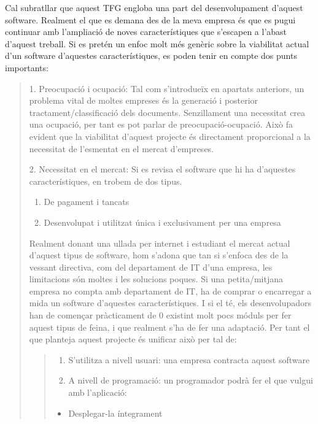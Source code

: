 \documentclass[letterpaper,11pt,catalan]{sphinxmanual}
\begin{document}
Cal subratllar que aquest TFG engloba una part del desenvolupament d'aquest software. Realment
el que es demana des de la meva empresa és que es pugui continuar amb l'ampliació de noves
característiques que s'escapen a l'abast d'aquest treball. Si es pretén un enfoc molt més
genèric sobre la viabilitat actual d'un software d'aquestes característiques, es poden
tenir en compte dos punts importants:
\begin{quote}

1. Preocupació i ocupació:
Tal com s'introdueïx en apartats anteriors, un problema vital de moltes empreses
és la generació i posterior tractament/classificació dels documents. Senzillament
una necessitat crea una ocupació, per tant es pot parlar de preocupació-ocupació.
Això fa evident que la viabilitat d'aquest projecte és directament proporcional
a la necessitat de l'esmentat en el mercat d'empreses.

2. Necessitat en el mercat:
Si es revisa el software que hi ha d'aquestes característiques, en trobem de dos tipus.
\begin{enumerate}
\item {} 
De pagament i tancats

\item {} 
Desenvolupat i utilitzat única i exclusivament per una empresa

\end{enumerate}

Realment donant una ullada per internet i estudiant el mercat actual d'aquest tipus de
software, hom s'adona que tan si s'enfoca des de la vessant directiva, com
del departament de IT d'una empresa, les limitacions són moltes i les solucions poques.
Si una petita/mitjana empresa no compta amb departament de IT, ha de comprar o encarregar
a mida un software d'aquestes característiques. I si el té, els desenvolupadors han
de començar pràcticament de 0 existint molt pocs móduls per fer aquest tipus de feina, i
que realment s'ha de fer una adaptació. Per tant el que planteja aquest projecte és unificar
això per tal de:
\begin{quote}
\begin{enumerate}
\item {} 
S'utilitza a nivell usuari: una empresa contracta aquest software

\item {} 
A nivell de programació: un programador podrà fer el que vulgui amb l'aplicació:

\end{enumerate}
\begin{itemize}
\item {} 
Desplegar-la íntegrament


\end{itemize}
\end{quote}
\end{quote}
\end{document}
